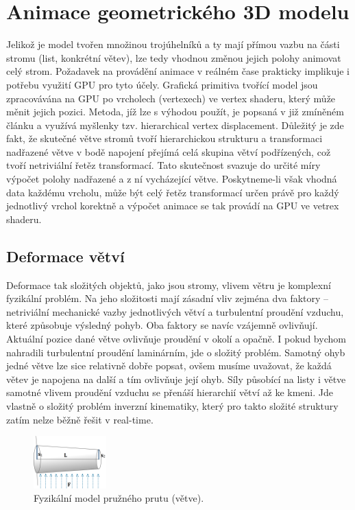 \section{Animace geometrického 3D modelu}
\label{sec-animation3D}

Jelikož je model tvořen množinou trojúhelníků a ty mají přímou vazbu na části stromu (list, konkrétní větev), lze tedy vhodnou změnou jejich polohy animovat celý strom. Požadavek na provádění animace v reálném čase prakticky implikuje i potřebu využití GPU pro tyto účely. Grafická primitiva tvořící model jsou zpracovávána na GPU po vrcholech (vertexech) ve vertex shaderu, který může měnit jejich pozici. 
Metoda, jíž lze s výhodou použít, je popsaná v již zmíněném článku \cite{Habel_09_PGT} a využívá myšlenky tzv. hierarchical vertex displacement. Důležitý je zde fakt, že skutečné větve stromů tvoří hierarchickou strukturu a transformaci nadřazené větve v bodě napojení přejímá celá skupina větví podřízených, což tvoří netriviální řetěz transformací. Tato skutečnost svazuje do určité míry výpočet polohy nadřazené a z ní vycházející větve. Poskytneme-li však vhodná data každému vrcholu, může být celý řetěz transformací určen právě pro každý jednotlivý vrchol korektně a výpočet animace se tak provádí na GPU ve vetrex shaderu.

\subsection{Deformace větví}
\label{sec-branchDeformation}

Deformace tak složitých objektů, jako jsou stromy, vlivem větru je komplexní fyzikální problém. Na jeho složitosti mají zásadní vliv zejména dva faktory – netriviální mechanické vazby jednotlivých větví a turbulentní proudění vzduchu, které způsobuje výsledný pohyb. Oba faktory se navíc vzájemně ovlivňují. Aktuální pozice dané větve ovlivňuje proudění v okolí a opačně. I pokud bychom nahradili turbulentní proudění laminárním, jde o složitý problém. Samotný ohyb jedné větve lze sice relativně dobře popsat, ovšem musíme uvažovat, že každá větev je napojena na další a tím ovlivňuje její ohyb. Síly působící na listy i větve samotné vlivem proudění vzduchu se přenáší hierarchií větví až ke kmeni. Jde vlastně o složitý problém inverzní kinematiky, který pro takto složité struktury zatím nelze běžně řešit v real-time. 
\begin{figure}[!hbt]
\begin{center}
\includegraphics[width=0.25\textwidth]{./figures/branchBeamModel.png}
\end{center}
\caption{Fyzikální model pružného prutu (větve).
\label{fig:branchBeamModel}
}
\end{figure}

